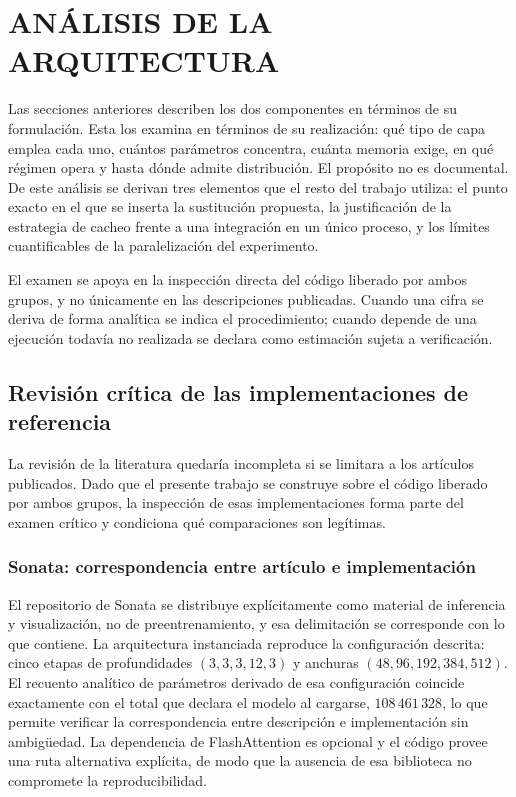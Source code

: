 

\chapter{ANÁLISIS DE LA ARQUITECTURA}
\label{sec:analisis-componentes}

Las secciones anteriores describen los dos componentes en términos de su
formulación. Esta los examina en términos de su realización: qué tipo de capa
emplea cada uno, cuántos parámetros concentra, cuánta memoria exige, en qué
régimen opera y hasta dónde admite distribución. El propósito no es documental.
De este análisis se derivan tres elementos que el resto del trabajo utiliza: el
punto exacto en el que se inserta la sustitución propuesta, la justificación de
la estrategia de cacheo frente a una integración en un único proceso, y los
límites cuantificables de la paralelización del experimento.

El examen se apoya en la inspección directa del código liberado por ambos
grupos, y no únicamente en las descripciones publicadas. Cuando una cifra se
deriva de forma analítica se indica el procedimiento; cuando depende de una
ejecución todavía no realizada se declara como estimación sujeta a
verificación.

\section{Revisión crítica de las implementaciones de referencia}
\label{sec:rev-implementaciones}

La revisión de la literatura quedaría incompleta si se limitara a los artículos
publicados. Dado que el presente trabajo se construye sobre el código liberado
por ambos grupos, la inspección de esas implementaciones forma parte del examen
crítico y condiciona qué comparaciones son legítimas.

\subsection{Sonata: correspondencia entre artículo e implementación}

El repositorio de Sonata se distribuye explícitamente como material de
inferencia y visualización, no de preentrenamiento, y esa delimitación se
corresponde con lo que contiene. La arquitectura instanciada reproduce la
configuración descrita: cinco etapas de profundidades $(3,3,3,12,3)$ y anchuras
$(48,96,192,384,512)$. El recuento analítico de parámetros derivado de esa
configuración coincide exactamente con el total que declara el modelo al
cargarse, $108\,461\,328$, lo que permite verificar la correspondencia entre
descripción e implementación sin ambigüedad. La dependencia de FlashAttention es
opcional y el código provee una ruta alternativa explícita, de modo que la
ausencia de esa biblioteca no compromete la reproducibilidad.

